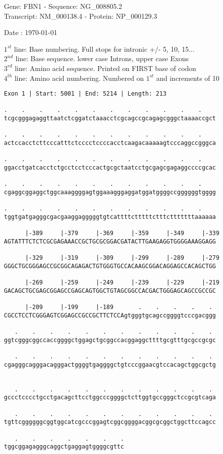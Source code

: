 \documentclass{article}
\begin{document}
\begin{center}
\begin{large}
Gene: FBN1 - Sequence: NG\_008805.2\\
Transcript: NM\_000138.4 - Protein: NP\_000129.3
 
 Date : \today
\end{large}
\end{center}
$1^{st}$ line: Base numbering. Full stops for intronic +/- 5, 10, 15...\\
$2^{nd}$ line: Base sequence. lower case Introns, upper case Exons\\
$3^{rd}$ line: Amino acid sequence. Printed on FIRST base of codon\\
$4^{th}$ line: Amino acid numbering. Numbered on $1^{st}$ and increments of 10\\
\begin{Verbatim}
Exon 1 | Start: 5001 | End: 5214 | Length: 213
 
.    .    .    .    .    .    .    .    .    .    .    .    
tcgcgggagaggttaatctcggatctaaacctcgcagccgcagagcgggctaaaaccgct
  
.    .    .    .    .    .    .    .    .    .    .    .    
actccacctcttcccatttctcccctccccacctcaagacaaaaagtcccaggccgggca
  
.    .    .    .    .    .    .    .    .    .    .    .    
ggacctgatcacctctgcctcctcccactgcgctaatcctgcgagcgagaggccccgcac
  
.    .    .    .    .    .    .    .    .    .    .    .    
cgaggcggaggctggcaaaggggagtggaaagggaggatggatggggccggggggtgggg
  
.    .    .    .    .    .    .    .    .    .    .    .    
tggtgatgagggcgacgaaggagggggtgtcattttctttttctttctttttttaaaaaa
  
      |-389     |-379     |-369     |-359     |-349     |-339
AGTATTTCTCTCGCGAGAAACCGCTGCGCGGACGATACTTGAAGAGGTGGGGAAAGGAGG
  
      |-329     |-319     |-309     |-299     |-289     |-279
GGGCTGCGGGAGCCGCGGCAGAGACTGTGGGTGCCACAAGCGGACAGGAGCCACAGCTGG
  
      |-269     |-259     |-249     |-239     |-229     |-219
GACAGCTGCGAGCGGAGCCGAGCAGTGGCTGTAGCGGCCACGACTGGGAGCAGCCGCCGC
  
      |-209     |-199     |-189       .    .    .    .    . 
CGCCTCCTCGGGAGTCGGAGCCGCCGCTTCTCCAgtgggtgcagccggggtcccgacggg
  
   .    .    .    .    .    .    .    .    .    .    .    . 
ggtcgggcggccaccggggctggagctgcggccacggaggcttttgcgtttgcgccgcgc
  
   .    .    .    .    .    .    .    .    .    .    .    . 
cgagggcagggacagggactggggtgaggggctgtcccggaacgtccacagctggcgctg


   .    .    .    .    .    .    .    .    .    .    .    . 
gccctcccctgcctgacagcttcctggcccggggctcttggtgccgggctccgcgtcaga
  
   .    .    .    .    .    .    .    .    .    .    .    . 
tgttcggggggcggtggcatcgcccggagtcggcggggacggcgcggctggcttccagcc
  
   .    .    .    .    .    .    .
tggcggagagggcaggctgaggagtggggcgttc
\end{Verbatim}
\end{document}
